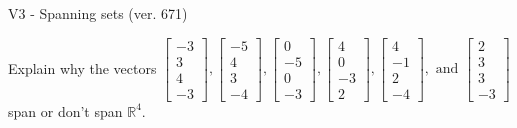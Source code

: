 \begin{exercise}
  \begin{exerciseTitle}V3 - Spanning sets (ver. 671)\end{exerciseTitle}
  \begin{exerciseStatement}
    Explain why the vectors \(\left[\begin{array}{r}
-3 \\
3 \\
4 \\
-3
\end{array}\right] , \left[\begin{array}{r}
-5 \\
4 \\
3 \\
-4
\end{array}\right] , \left[\begin{array}{r}
0 \\
-5 \\
0 \\
-3
\end{array}\right] , \left[\begin{array}{r}
4 \\
0 \\
-3 \\
2
\end{array}\right] , \left[\begin{array}{r}
4 \\
-1 \\
2 \\
-4
\end{array}\right] , \text{ and } \left[\begin{array}{r}
2 \\
3 \\
3 \\
-3
\end{array}\right]\) span or don't span \(\mathbb{R}^4\). 
	



\end{exerciseStatement}
\end{exercise}
